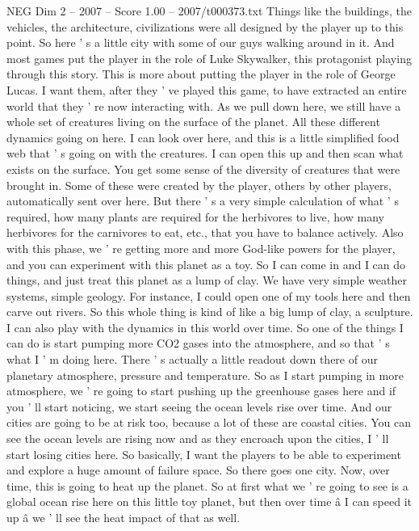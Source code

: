 \begin{textsample}{NEG Dim 2 – 2007 – Score 1.00 – 2007/t000373.txt}
Things like the buildings, the vehicles, the architecture, civilizations were all designed by the player up to this point.
So here ' s a little city with some of our guys walking around in it.
And most games put the player in the role of Luke Skywalker, this protagonist playing through this story.
This is more about putting the player in the role of George Lucas.
I want them, after they ' ve played this game, to have extracted an entire world that they ' re now interacting with.
As we pull down here, we still have a whole set of creatures living on the surface of the planet.
All these different dynamics going on here.
I can look over here, and this is a little simplified food web that ' s going on with the creatures.
I can open this up and then scan what exists on the surface.
You get some sense of the diversity of creatures that were brought in.
Some of these were created by the player, others by other players, automatically sent over here.
But there ' s a very simple calculation of what ' s required, how many plants are required for the herbivores to live, how many herbivores for the carnivores to eat, etc., that you have to balance actively.
Also with this phase, we ' re getting more and more God-like powers for the player, and you can experiment with this planet as a toy.
So I can come in and I can do things, and just treat this planet as a lump of clay.
We have very simple weather systems, simple geology.
For instance, I could open one of my tools here and then carve out rivers.
So this whole thing is kind of like a big lump of clay, a sculpture.
I can also play with the dynamics in this world over time.
So one of the things I can do is start pumping more CO2 gases into the atmosphere, and so that ' s what I ' m doing here.
There ' s actually a little readout down there of our planetary atmosphere, pressure and temperature.
So as I start pumping in more atmosphere, we ' re going to start pushing up the greenhouse gases here and if you ' ll start noticing, we start seeing the ocean levels rise over time.
And our cities are going to be at risk too, because a lot of these are coastal cities.
You can see the ocean levels are rising now and as they encroach upon the cities, I ' ll start losing cities here.
So basically, I want the players to be able to experiment and explore a huge amount of failure space.
So there goes one city.
Now, over time, this is going to heat up the planet.
So at first what we ' re going to see is a global ocean rise here on this little toy planet, but then over time â I can speed it up â we ' ll see the heat impact of that as well.

\end{textsample}
